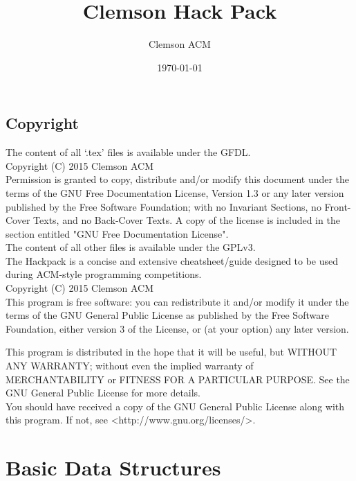 \documentclass[letterpaper, 10pt]{report}
\title{Clemson Hack Pack}
\author{Clemson ACM}
\date{\today}
\begin{document}
\maketitle

\section*{Copyright}
The content of all `.tex' files is available under the GFDL. \\
Copyright (C)  2015  Clemson ACM \\
Permission is granted to copy, distribute and/or modify this document
under the terms of the GNU Free Documentation License, Version 1.3
or any later version published by the Free Software Foundation;
with no Invariant Sections, no Front-Cover Texts, and no Back-Cover Texts.
A copy of the license is included in the section entitled "GNU
Free Documentation License".\\

The content of all other files is available under the GPLv3. \\
The Hackpack is a concise and extensive cheatsheet/guide designed to be used during ACM-style programming competitions. \\
Copyright (C)  2015  Clemson ACM \\

This program is free software: you can redistribute it and/or modify
it under the terms of the GNU General Public License as published by
the Free Software Foundation, either version 3 of the License, or
(at your option) any later version.

This program is distributed in the hope that it will be useful,
but WITHOUT ANY WARRANTY; without even the implied warranty of
MERCHANTABILITY or FITNESS FOR A PARTICULAR PURPOSE\@. See the
GNU General Public License for more details. \\

You should have received a copy of the GNU General Public License
along with this program. If not, see <http://www.gnu.org/licenses/>.


\break



\tableofcontents

\chapter{Basic Data Structures}





\end{document}
